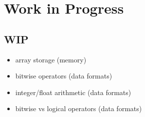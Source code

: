 \chapter{Work in Progress}

\section{WIP}

\begin{itemize}
	\item array storage (memory)
	\item bitwise operators (data formats)
	\item integer/float arithmetic (data formats)
	\item bitwise vs logical operators (data formats)
\end{itemize}
